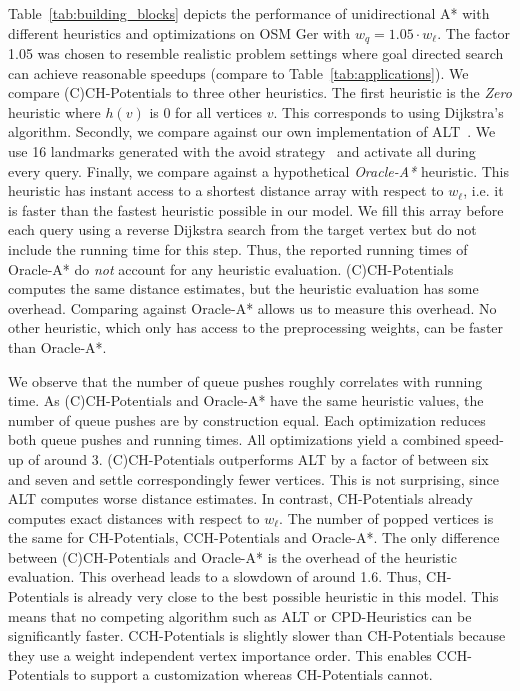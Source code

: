 \documentclass[manuscript,review]{acmart}
\begin{document}
Table~\ref{tab:building_blocks} depicts the performance of unidirectional A* with different heuristics and optimizations on OSM Ger with $w_q = 1.05 \cdot w_\ell$.
The factor 1.05 was chosen to resemble realistic problem settings where goal directed search can achieve reasonable speedups (compare to Table~\ref{tab:applications}).
We compare (C)CH-Potentials to three other heuristics.
The first heuristic is the \emph{Zero} heuristic where $h(v)$ is $0$ for all vertices $v$.
This corresponds to using Dijkstra's algorithm.
Secondly, we compare against our own implementation of ALT~\cite{gw-cppsp-05}.
We use 16 landmarks generated with the avoid strategy~\cite{gw-cppsp-05} and activate all during every query.
Finally, we compare against a hypothetical \emph{Oracle-A*} heuristic.
This heuristic has instant access to a shortest distance array with respect to $w_\ell$, i.e. it is faster than the fastest heuristic possible in our model.
We fill this array before each query using a reverse Dijkstra search from the target vertex but do not include the running time for this step.
Thus, the reported running times of Oracle-A* do \emph{not} account for any heuristic evaluation.
(C)CH-Potentials computes the same distance estimates, but the heuristic evaluation has some overhead.
Comparing against Oracle-A* allows us to measure this overhead.
No other heuristic, which only has access to the preprocessing weights, can be faster than Oracle-A*.

We observe that the number of queue pushes roughly correlates with running time.
As (C)CH-Potentials and Oracle-A* have the same heuristic values, the number of queue pushes are by construction equal.
Each optimization reduces both queue pushes and running times.
All optimizations yield a combined speed-up of around 3.
(C)CH-Potentials outperforms ALT by a factor of between six and seven and settle correspondingly fewer vertices.
This is not surprising, since ALT computes worse distance estimates.
In contrast, CH-Potentials already computes exact distances with respect to $w_\ell$.
The number of popped vertices is the same for CH-Potentials, CCH-Potentials and Oracle-A*.
The only difference between (C)CH-Potentials and Oracle-A* is the overhead of the heuristic evaluation.
This overhead leads to a slowdown of around 1.6.
Thus, CH-Potentials is already very close to the best possible heuristic in this model.
This means that no competing algorithm such as ALT or CPD-Heuristics can be significantly faster.
CCH-Potentials is slightly slower than CH-Potentials because they use a weight independent vertex importance order.
This enables CCH-Potentials to support a customization whereas CH-Potentials cannot.
\end{document}
